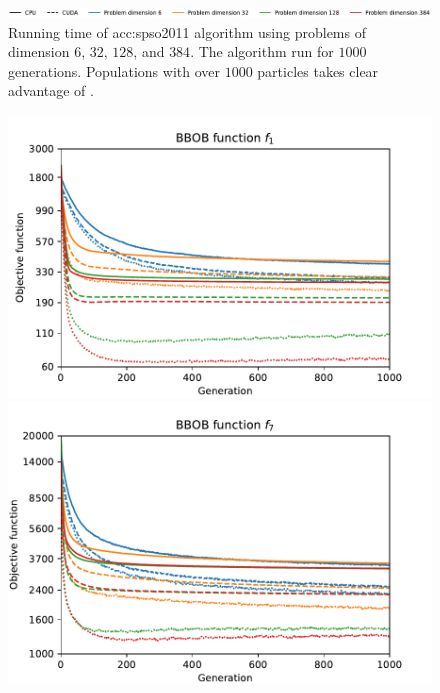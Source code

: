 \begin{figure}[ht!]
\begin{minipage}[t]{0.32\textwidth}
    \end{minipage}

    \begin{minipage}{\textwidth}
        \centering
        \includegraphics[width=\textwidth]{img/runs/time_pso2011_alldim_legend.pdf}
    \end{minipage}

    \caption[Running time of PSO2011]{Running time of \acrlong{acc:spso2011} algorithm using problems of dimension $6$, $32$, $128$, and $384$. The algorithm run for $1000$ generations. Populations with over $1000$ particles takes clear advantage of \gpu.}
\end{figure}

\begin{figure}[ht!]
    \begin{minipage}[t]{0.32\textwidth}
        \centering
        \includegraphics[width=\textwidth]{img/runs/fitness_pso2011_f1.pdf}
    \end{minipage}
    \hfill
    \begin{minipage}[t]{0.32\textwidth}
        \centering
        \includegraphics[width=\textwidth]{img/runs/fitness_pso2011_f7.pdf}

\end{minipage}
\end{figure}

